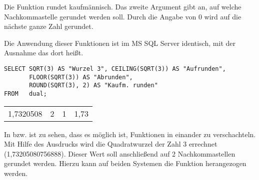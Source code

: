         \begin{merke}
          Die Funktion  rundet kaufmännisch. Das zweite
          Argument gibt an, auf welche Nachkommastelle gerundet werden soll.
          Durch die Angabe von 0 wird auf die nächste ganze Zahl gerundet.
        \end{merke}
        Die Anwendung dieser Funktionen ist im MS SQL Server identisch, mit der
        Ausnahme das  dort 
        heißt.
\clearpage
        \begin{lstlisting}[language=ms_sql,caption={Rundungsfunktionen in MS SQL},label=sql03_16]
SELECT SQRT(3) AS "Wurzel 3", CEILING(SQRT(3)) AS "Aufrunden",
       FLOOR(SQRT(3)) AS "Abrunden",
       ROUND(SQRT(3), 2) AS "Kaufm. runden"
FROM   dual;
        \end{lstlisting}
        \begin{center}
          \begin{small}
            \tablehead{}

            \begin{mssql}
              \begin{supertabular}{llll}
                1,7320508 & 2 & 1 & 1,73 \\
              \end{supertabular}
            \end{mssql}
          \end{small}
        \end{center}
        In  bzw.  ist zu sehen, dass es
        möglich ist, Funktionen in einander zu verschachteln. Mit Hilfe des
        Ausdrucks  wird die Quadratwurzel der Zahl 3
        errechnet (1,73205080756888). Dieser Wert soll anschließend auf 2
        Nachkommastellen gerundet werden. Hierzu kann auf beiden Systemen die
        Funktion  herangezogen werden. 
        
